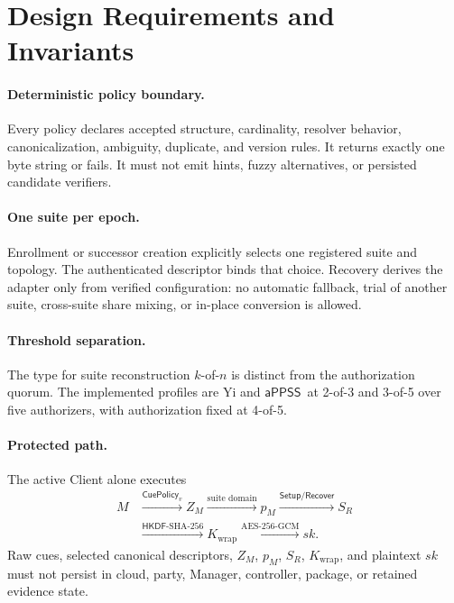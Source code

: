 \documentclass[sigconf,anonymous]{acmart}
\newcommand{\APPSS}{\ensuremath{\mathsf{aPPSS}}}
\newcommand{\CuePolicy}{\ensuremath{\mathsf{CuePolicy}}}
\newcommand{\HKDF}{\ensuremath{\mathsf{HKDF}}}
\newcommand{\Setup}{\ensuremath{\mathsf{Setup}}}
\newcommand{\Recover}{\ensuremath{\mathsf{Recover}}}
\begin{document}
\section{Design Requirements and Invariants}
\label{sec:requirements}

\paragraph{Deterministic policy boundary.}
Every policy declares accepted structure, cardinality, resolver behavior,
canonicalization, ambiguity, duplicate, and version rules. It returns exactly
one byte string or fails. It must not emit hints, fuzzy alternatives, or
persisted candidate verifiers.

\paragraph{One suite per epoch.}
Enrollment or successor creation explicitly selects one registered suite and
topology. The authenticated descriptor binds that choice. Recovery derives the
adapter only from verified configuration: no automatic fallback, trial of
another suite, cross-suite share mixing, or in-place conversion is allowed.

\paragraph{Threshold separation.}
The type for suite reconstruction \(k\)-of-\(n\) is distinct from the
authorization quorum. The implemented profiles are Yi and \APPSS\ at 2-of-3
and 3-of-5 over five authorizers, with authorization fixed at 4-of-5.

\paragraph{Protected path.}
The active Client alone executes
\[
\begin{split}
M &\xrightarrow{\CuePolicy_v} Z_M
  \xrightarrow{\text{suite domain}} p_M
  \xrightarrow{\Setup/\Recover} S_R \\
  &\xrightarrow{\HKDF\text{-SHA-256}} K_{\mathrm{wrap}}
  \xrightarrow{\mathrm{AES\mbox{-}256\mbox{-}GCM}} sk .
\end{split}
\]
Raw cues, selected canonical descriptors, \(Z_M\), \(p_M\), \(S_R\),
\(K_{\mathrm{wrap}}\), and plaintext \(sk\) must not persist in cloud, party,
Manager, controller, package, or retained evidence state.
\end{document}
